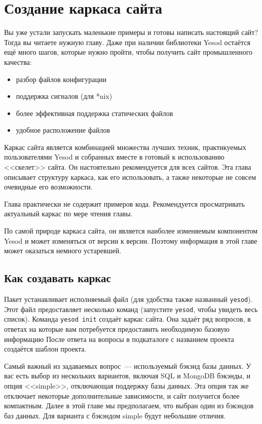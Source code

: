 \chapter{Создание каркаса сайта}\label{chap:scaffolding}
Вы уже устали запускать маленькие примеры и готовы написать настоящий сайт?
Тогда вы читаете нужную главу. Даже при наличии библиотеки Yesod
остаётся ещё много шагов, которые нужно пройти, чтобы получить сайт
промышленного качества:
\begin{itemize}
  \item разбор файлов конфигурации
  \item поддержка сигналов (для *nix)
  \item более эффективная поддержка статических файлов
  \item удобное расположение файлов
\end{itemize}

Каркас сайта является комбинацией множества лучших техник, практикуемых пользователями Yesod и собранных вместе в готовый к
использованию <<скелет>> сайта. Он настоятельно рекомендуется для всех сайтов.
Эта глава описывает структуру каркаса, как его использовать, а также некоторые
не совсем очевидные его возможности.

Глава практически не содержит примеров кода. Рекомендуется
просматривать актуальный каркас по мере чтения главы.

\begin{remark}
  По самой природе каркаса сайта, он является наиболее изменяемым компонентом Yesod и
  может изменяться от версии к версии. Поэтому информация в этой главе может оказаться немного устаревшей.
\end{remark}

\section{Как создавать каркас}
Пакет 
устанавливает исполняемый файл (для удобства
также названный \texttt{yesod}). Этот файл предоставляет несколько
команд (запустите \texttt{yesod}, чтобы увидеть весь список). Команда
\texttt{yesod init} создаёт каркас сайта. Она задаёт ряд вопросов, в ответах на которые
вам потребуется предоставить необходимую базовую информацию
После ответа на вопросы в подкаталоге с
названием проекта создаётся шаблон проекта.

Самый важный из задаваемых вопрос~--- используемый бэкэнд базы данных. У вас есть выбор из
нескольких вариантов, включая SQL и MongoDB бэкэнды, и опция <<simple>>, отключающая
поддержку базы данных. Эта опция так же отключает некоторые дополнительные
зависимости, и сайт получится более компактным. Далее в этой главе мы предполагаем,
что выбран один из бэкэндов баз данных. Для варианта с бэкэндом simple
будут небольшие отличия.

